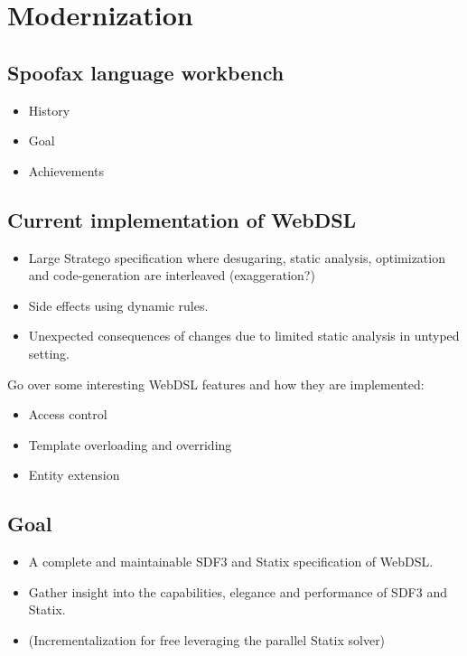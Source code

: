 
\chapter{\label{chap:modernization}Modernization}

  \section{Spoofax language workbench}

    \begin{itemize}
      \item History
      \item Goal
      \item Achievements
    \end{itemize}

  \section{Current implementation of WebDSL}

    \begin{itemize}
      \item Large Stratego specification where desugaring, static analysis, optimization and code-generation are interleaved (exaggeration?)
      \item Side effects using dynamic rules.
      \item Unexpected consequences of changes due to limited static analysis in untyped setting.
    \end{itemize}

    Go over some interesting WebDSL features and how they are implemented:
    \begin{itemize}
      \item Access control
      \item Template overloading and overriding
      \item Entity extension
    \end{itemize}

  \section{Goal}

    \begin{itemize}
      \item A complete and maintainable SDF3 and Statix specification of WebDSL.
      \item Gather insight into the capabilities, elegance and performance of SDF3 and Statix.
      \item (Incrementalization for free leveraging the parallel Statix solver)
    \end{itemize}
